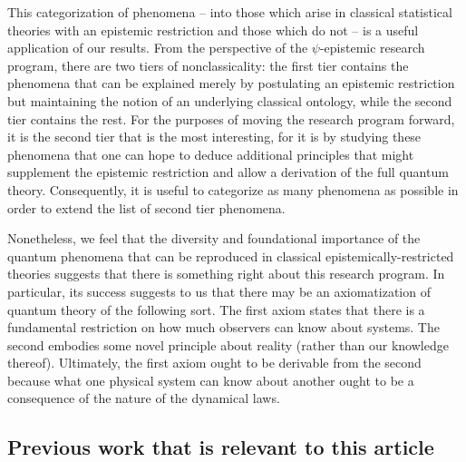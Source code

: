 \documentclass[pra,superscriptaddress,nofootinbib,12pt]{revtex4-2}
\begin{document}
This categorization of phenomena -- into those which arise in classical statistical theories with an epistemic restriction and those which do not -- is a useful application of our results.  From the perspective of the $\psi$-epistemic research program, there are two tiers of nonclassicality: the
first tier contains the phenomena that can be explained merely by
postulating an epistemic restriction but maintaining the notion of an
underlying classical ontology, while the second tier contains the rest.
For the purposes of moving the research program forward, it is the second
tier that is the most interesting, for it is by studying these phenomena
that one can hope to deduce additional principles that might supplement the
epistemic restriction and allow a derivation of the full quantum theory.
Consequently, it is useful to categorize as many phenomena as possible in
order to extend the list of second tier phenomena.

Nonetheless, we feel that the diversity and foundational importance of the
quantum phenomena that can be reproduced in classical
epistemically-restricted theories suggests that there is something right
about this research program.  In particular, its success suggests to us
that there may be an axiomatization of quantum theory of the following sort.
The first axiom states that there is a fundamental restriction on how much
observers can know about systems.  The second embodies some novel principle
about reality (rather than our knowledge thereof).  Ultimately, the first axiom ought to be derivable from the second because what one physical system can know about another ought to be a consequence of the nature of the
dynamical laws.

\subsection{Previous work that is relevant to this article}
\end{document}

